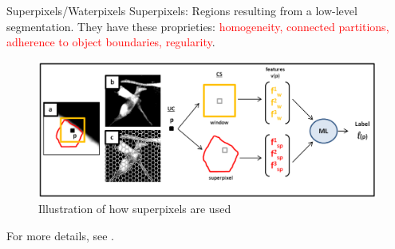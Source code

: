 \documentclass{beamer}
\begin{document}
\begin{frame}{Superpixels/Waterpixels}
Superpixels: Regions resulting from a low-level segmentation. 
They have these proprieties: \textcolor{red}{homogeneity, connected partitions, adherence to object boundaries, regularity}.
\begin{figure}[!ht]
\centering
\includegraphics[width=\textwidth]{Waterpixels.png}
\caption{Illustration of how superpixels are used}
\label{}
\end{figure}
\begin{small}
For more details, see \cite{deconvolution}.
\end{small}
\end{frame}
\end{document}
